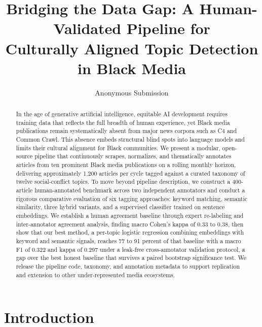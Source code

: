 \documentclass[letterpaper]{article}
\title{Bridging the Data Gap: A Human-Validated Pipeline for\\
Culturally Aligned Topic Detection in Black Media}
\author{
    Anonymous Submission
}
\begin{document}
\maketitle

\begin{abstract}
In the age of generative artificial intelligence, equitable AI development
requires training data that reflects the full breadth of human experience,
yet Black media publications remain systematically absent from major news
corpora such as C4 and Common Crawl. This absence embeds structural blind
spots into language models and limits their cultural alignment for Black
communities. We present a modular, open-source pipeline that continuously
scrapes, normalizes, and thematically annotates articles from ten prominent
Black media publications on a rolling monthly horizon, delivering
approximately 1,200 articles per cycle tagged against a curated taxonomy of
twelve social-conflict topics. To move beyond pipeline description, we
construct a 400-article human-annotated benchmark across two independent
annotators and conduct a rigorous comparative evaluation of six tagging
approaches: keyword matching, semantic similarity, three hybrid variants,
and a supervised classifier trained on sentence embeddings. We establish a
human agreement baseline through expert re-labeling and inter-annotator
agreement analysis, finding macro Cohen's kappa of 0.33 to 0.38, then show
that our best method, a per-topic logistic regression combining embeddings
with keyword and semantic signals, reaches 77 to 91 percent of that
baseline with a macro F1 of 0.322 and kappa of 0.297 under a leak-free
cross-annotator validation protocol, a gap over the best honest baseline
that survives a paired bootstrap significance test. We release the
pipeline code, taxonomy, and annotation metadata to support replication
and extension to other under-represented media ecosystems.
\end{abstract}

\section{Introduction}
\end{document}
